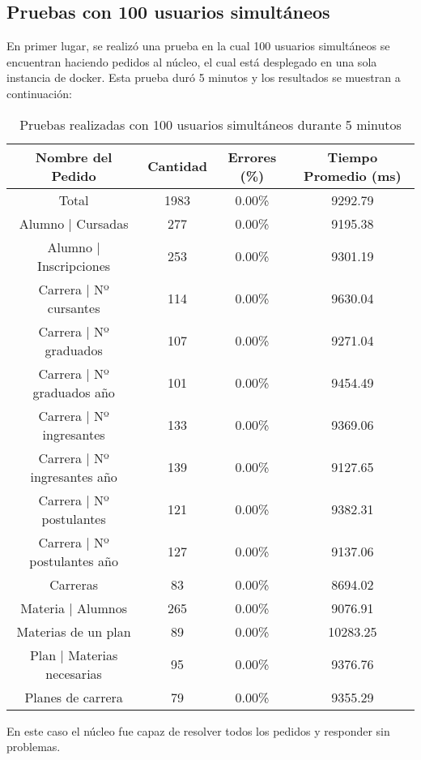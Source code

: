 \subsection{Pruebas con 100 usuarios simultáneos}
\break
En primer lugar, se realizó una prueba en la cual 100 usuarios simultáneos se encuentran haciendo pedidos al núcleo, el cual está desplegado en una sola instancia de docker.
Esta prueba duró 5 minutos y los resultados se muestran a continuación:
\begin{table}[]
    \centering
    \makegapedcells
    \begin{tabular}{|c|c|c|c|}
    \hline
    Nombre del Pedido & Cantidad & Errores (\%) & Tiempo Promedio (ms) \\ \hline
    Total & 1983 & 0.00\% & 9292.79 \\ \hline
    Alumno | Cursadas & 277 & 0.00\% & 9195.38 \\ \hline
    Alumno | Inscripciones & 253 & 0.00\% & 9301.19\\ \hline
    Carrera | Nº cursantes & 114 & 0.00\% & 9630.04\\ \hline
    Carrera | Nº graduados & 107 & 0.00\% & 9271.04\\ \hline
    Carrera | Nº graduados año & 101 & 0.00\% & 9454.49\\ \hline
    Carrera | Nº ingresantes & 133 & 0.00\% & 9369.06\\ \hline
    Carrera | Nº ingresantes año & 139 & 0.00\% & 9127.65\\ \hline
    Carrera | Nº postulantes & 121 & 0.00\% & 9382.31\\ \hline
    Carrera | Nº postulantes año & 127 & 0.00\% & 9137.06\\ \hline
    Carreras & 83 & 0.00\% & 8694.02\\ \hline
    Materia | Alumnos & 265 & 0.00\% & 9076.91\\ \hline
    Materias de un plan & 89 & 0.00\% & 10283.25\\ \hline
    Plan | Materias necesarias & 95 & 0.00\% & 9376.76\\ \hline
    Planes de carrera & 79 & 0.00\% & 9355.29\\ \hline

    \end{tabular}
    \caption{Pruebas realizadas con 100 usuarios simultáneos durante 5 minutos}
    \label{tab:tabla_planes}
\end{table}

En este caso el núcleo fue capaz de resolver todos los pedidos y responder sin problemas.

